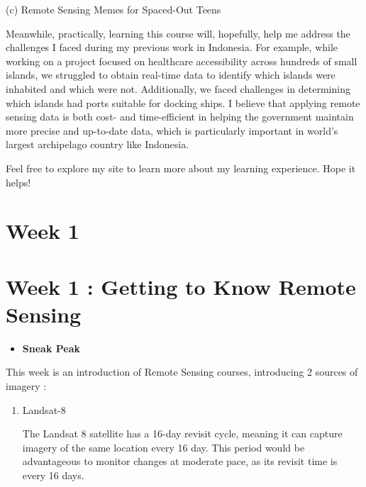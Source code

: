 \documentclass[
  letterpaper,
  DIV=11,
  numbers=noendperiod]{scrreprt}
\providecommand{\tightlist}{%
  \setlength{\itemsep}{0pt}\setlength{\parskip}{0pt}}\usepackage{longtable,booktabs,array}
\begin{document}
(c) Remote Sensing Memes for Spaced-Out Teens

Meanwhile, practically, learning this course will, hopefully, help me
address the challenges I faced during my previous work in Indonesia. For
example, while working on a project focused on healthcare accessibility
across hundreds of small islands, we struggled to obtain real-time data
to identify which islands were inhabited and which were not.
Additionally, we faced challenges in determining which islands had ports
suitable for docking ships. I believe that applying remote sensing data
is both cost- and time-efficient in helping the government maintain more
precise and up-to-date data, which is particularly important in world's
largest archipelago country like Indonesia.

Feel free to explore my site to learn more about my learning experience.
Hope it helps!


\hypertarget{week-1}{%
\chapter{Week 1}\label{week-1}}


\hypertarget{week-1-getting-to-know-remote-sensing}{%
\chapter{Week 1 : Getting to Know Remote
Sensing}\label{week-1-getting-to-know-remote-sensing}}

\begin{itemize}
\tightlist
\item
  \textbf{Sneak Peak}
\end{itemize}

This week is an introduction of Remote Sensing courses, introducing 2
sources of imagery :

\begin{enumerate}
\def\labelenumi{\arabic{enumi}.}
\item
  Landsat-8

  The Landsat 8 satellite has a 16-day revisit cycle, meaning it can
  capture imagery of the same location every 16 day. This period would
  be advantageous to monitor changes at moderate pace, as its revisit
  time is every 16 days.
\end{enumerate}
\end{document}
